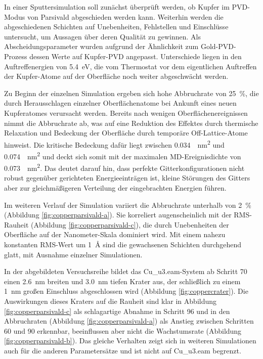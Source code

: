 In einer Sputtersimulation soll zunächst überprüft werden, ob Kupfer im PVD-Modus von Parsivald abgeschieden werden kann.
Weiterhin werden die abgeschiedenen Schichten auf Unebenheiten, Fehlstellen und Einschlüsse untersucht, um Aussagen über deren Qualität zu gewinnen.
Als Abscheidungsparameter wurden aufgrund der Ähnlichkeit zum Gold-PVD-Prozess dessen Werte auf Kupfer-PVD angepasst.
Unterschiede liegen in den Auftreffenergien von \SI{5.4}{\electronvolt}, die vom Thermostat vor dem eigentlichen Auftreffen der Kupfer-Atome auf der Oberfläche noch weiter abgeschwächt werden.

Zu Beginn der einzelnen Simulation ergeben sich hohe Abbruchrate von \SI{25}{\percent}, die durch Herausschlagen einzelner Oberflächenatome bei Ankunft eines neuen Kupferatomes verursacht werden.
Bereits nach wenigen Oberflächenereignissen nimmt die Abbruchrate ab, was auf eine Reduktion des Effektes durch thermische Relaxation und Bedeckung der Oberfläche durch temporäre Off-Lattice-Atome hinweist.
Die kritische Bedeckung dafür liegt zwischen \SI{0.034}{\per\nano\meter\squared} und \SI{0.074}{\per\nano\meter\squared} und deckt sich somit mit der maximalen MD-Ereignisdichte von \SI{0.073}{\per\nano\meter\squared}.
Das deutet darauf hin, dass perfekte Gitterkonfigurationen nicht robust gegenüber gerichteten Energieeinträgen ist, kleine Störungen des Gitters aber zur gleichmäßigeren Verteilung der eingebrachten Energien führen.

Im weiteren Verlauf der Simulation variiert die Abbruchrate unterhalb von \SI{2}{\percent} (Abbildung \ref{fig:copperparsivald-a}).
Sie korreliert augenscheinlich mit der RMS-Rauheit (Abbildung \ref{fig:copperparsivald-c}), die durch Unebenheiten der Oberfläche auf der Nanometer-Skala dominiert wird.
Mit einem nahezu konstanten RMS-Wert um \SI{1}{\angstrom} sind die gewachsenen Schichten durchgehend glatt, mit Ausnahme einzelner Simulationen.

In der abgebildeten Versuchsreihe bildet das Cu\_u3.eam-System ab Schritt 70 einen \SI{2.6}{\nano\meter} breiten und \SI{3.0}{\nano\meter} tiefen Krater aus, der schließlich zu einem \SI{1}{\nano\meter} großen Einschluss abgeschlossen wird (Abbildung \ref{fig:coppercrater}).
Die Auswirkungen dieses Kraters auf die Rauheit sind klar in Abbildung \ref{fig:copperparsivald-c} als schlagartige Abnahme in Schritt 96 und in den Abbruchraten (Abbildung \ref{fig:copperparsivald-a}) als Anstieg zwischen Schritten 60 und 90 erkennbar, beeinflussen aber nicht die Wachstumsrate (Abbildung \ref{fig:copperparsivald-b}).
Das gleiche Verhalten zeigt sich in weiteren Simulationen auch für die anderen Parametersätze und ist nicht auf Cu\_u3.eam begrenzt.

